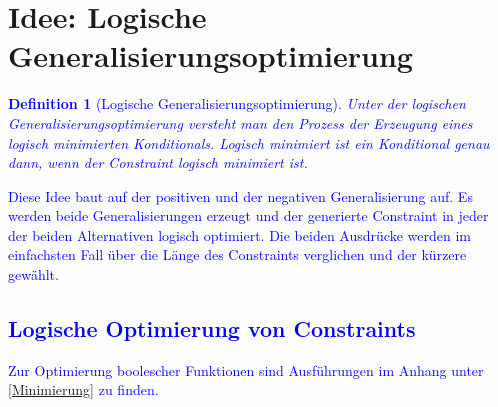\documentclass[a4paper, 11pt]{book}
\newtheorem{Def}{Definition }[section]
\begin{document}
\section{Idee: Logische Generalisierungsoptimierung}  \label{Logische Genopt}
\textcolor{blue}{
\begin{Def}[Logische Generalisierungsoptimierung]
	Unter der logischen Generalisierungsoptimierung versteht man den Prozess der Erzeugung eines logisch minimierten Konditionals. Logisch minimiert ist ein Konditional genau dann, wenn der Constraint logisch minimiert ist.  
\end{Def}
Diese Idee baut auf der positiven und der negativen Generalisierung auf. Es werden beide Generalisierungen erzeugt und der generierte Constraint in jeder der beiden Alternativen logisch optimiert. Die beiden Ausdrücke werden im einfachsten Fall über die Länge des Constraints verglichen und der kürzere gewählt.\\
\subsection{Logische Optimierung von Constraints} \label{LogOpt}
Zur Optimierung boolescher Funktionen sind Ausführungen im Anhang unter \ref{Minimierung} zu finden.
}
\end{document}
